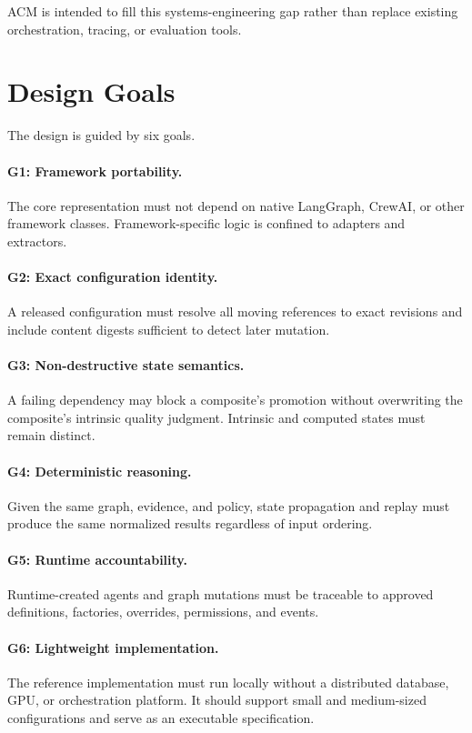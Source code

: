 \documentclass[10pt]{article}
\begin{document}
ACM is intended to fill this systems-engineering gap rather than replace existing orchestration, tracing, or evaluation tools.

\section{Design Goals}
\label{sec:goals}

The design is guided by six goals.

\paragraph{G1: Framework portability.}
The core representation must not depend on native LangGraph, CrewAI, or other framework classes. Framework-specific logic is confined to adapters and extractors.

\paragraph{G2: Exact configuration identity.}
A released configuration must resolve all moving references to exact revisions and include content digests sufficient to detect later mutation.

\paragraph{G3: Non-destructive state semantics.}
A failing dependency may block a composite's promotion without overwriting the composite's intrinsic quality judgment. Intrinsic and computed states must remain distinct.

\paragraph{G4: Deterministic reasoning.}
Given the same graph, evidence, and policy, state propagation and replay must produce the same normalized results regardless of input ordering.

\paragraph{G5: Runtime accountability.}
Runtime-created agents and graph mutations must be traceable to approved definitions, factories, overrides, permissions, and events.

\paragraph{G6: Lightweight implementation.}
The reference implementation must run locally without a distributed database, GPU, or orchestration platform. It should support small and medium-sized configurations and serve as an executable specification.
\end{document}
